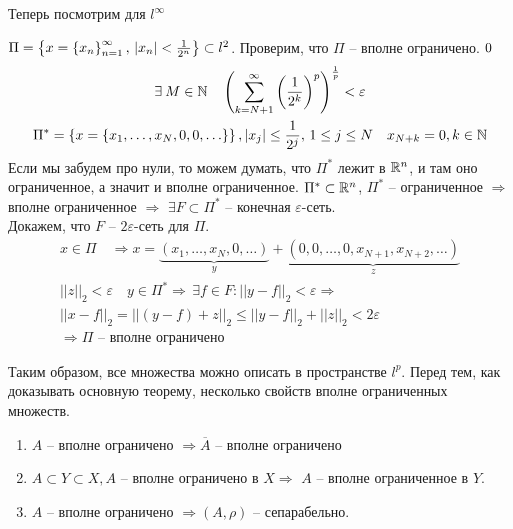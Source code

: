 \documentclass[document]{subfiles}
\begin{document}
Теперь посмотрим для $l^\infty$
\begin{example}
    $ \Pi = \left\{x = \left\{x_n\right\}^\infty_{n=1}, \, |x_n| < \frac{1}{2^n}\right\} \subset l^2$.
    Проверим, что $\Pi$ -- вполне ограничено.
    $\let \varepsilon > 0 $
    \begin{gather*}
        \exists M \in \bN \quad \left( \sum^\infty_{k=N+1} \left( \frac{1}{2^k} \right)^p \right)^{\frac{1}{p}} < \varepsilon \\
        \Pi^* = \seq{x = \seq{x_1, \ldots, x_N, 0, 0, \ldots}}, |x_j| \leq \frac{1}{2^j}, \, 1 \leq j \leq N \quad x_{N+k} =0, k \in \bN
    \end{gather*}
    Если мы забудем про нули, то можем думать, что $\Pi^*$ лежит в $\mathbb{R}^n$, и там оно ограниченное, а значит и вполне ограниченное.
    $\Pi^* \subset \mathbb{R}^n$, $\Pi^*$ -- ограниченное $\Rightarrow$ вполне ограниченное $\Rightarrow$ 
    $\exists F \subset \Pi^*$ -- конечная $\varepsilon$-сеть. \\
    Докажем, что $F$ -- $2\varepsilon$-сеть для $\Pi$.
    \begin{gather*}
        x \in \Pi \quad \Rightarrow x = \underbrace{(x_1, \ldots, x_N, 0, \ldots)}_y + \underbrace{(0, 0, \ldots, 0, x_{N+1}, x_{N+2}, \ldots)}_z \\
        ||z||_2 < \varepsilon \quad y \in \Pi^* \Rightarrow \, \exists f \in F : ||y - f||_2 < \varepsilon \Rightarrow \\
        ||x - f||_2 = ||(y-f)+z||_2 \leq ||y-f||_2 + ||z||_2 < 2 \varepsilon \\
        \Rightarrow \Pi \text{ -- вполне ограничено }
    \end{gather*}
\end{example}

Таким образом, все множества можно описать в пространстве $l^p$.
Перед тем, как доказывать основную теорему, несколько свойств вполне ограниченных множеств.

\begin{property}
    \begin{enumerate}
        \item $A$ -- вполне ограничено $\Rightarrow \overline{A}$ -- вполне ограничено 
        \item $A \subset Y \subset X, A$  -- вполне ограничено в $X \Rightarrow$  $A$ -- вполне ограниченное в $Y$.
        \item $A$ -- вполне ограничено $\Rightarrow (A, \rho)$ -- сепарабельно.
    \end{enumerate}
\end{property}
\end{document}

